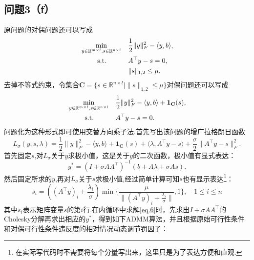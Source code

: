\documentclass[10pt,a4paper]{article}
\begin{document}
\subsection{问题3（f）}
原问题的对偶问题还可以写成
\begin{equation*}
	\begin{aligned}
		&\min_{y\in\mathbb{R}^{m\times l},s\in\mathbb{R}^{n\times l}}  &&\frac{1}{2}\|y\|_F^2 - \langle y, b\rangle,\\
		&\text{\quad\quad\, s.t.} &&A^{\top}y-s=0,\\
		&&&\|s\|_{1,2}\leq\mu.
	\end{aligned}
\end{equation*}
去掉不等式约束，令集合$\textbf{C}=\{s\in\mathbb{R}^{n\times l}|\|s\|_{1,2}\leq\mu\}$对偶问题还可以写成
\begin{equation*}
	\begin{aligned}
		&\min_{y\in\mathbb{R}^{m\times l},s\in\mathbb{R}^{n\times l}}  &&\frac{1}{2}\|y\|_F^2 - \langle y, b\rangle+\mathbf{1}_{\textbf{C}}(s),\\
		&\text{\quad\quad\, s.t.} &&A^{\top}y-s=0.\\
	\end{aligned}
\end{equation*}
问题化为这种形式即可使用交替方向乘子法.首先写出该问题的增广拉格朗日函数
$$L_{\sigma}(y,s,\lambda)=\frac{1}{2}\|y\|_F^2 - \langle y, b\rangle+\mathbf{1}_{\textbf{C}}(s)+\langle\lambda, A^{\top}y-s\rangle +\frac{\sigma}{2}\|A^{\top}y-s\|_{F}^{2}.$$
首先固定$s$,对$L_{\sigma}$关于$y$求极小值，这是关于$y$的二次函数，极小值有显式表达：
\begin{equation}
y^{*}=(I+\sigma AA^{\top})^{-1}(b+A\lambda+\sigma As).
\label{eq.6}
\end{equation}
然后固定所求的$y$,再对$L_{\sigma}$关于$s$求极小值,经过简单计算可知$s$也有显示表达\footnote{在实际写代码时不需要将每个分量写出来，这里只是为了表达方便和直观.}：
\begin{equation}
	s_{i}=\left( (A^{\top}y)_{i}+\frac{\lambda_{i}}{\sigma}\right) \min\{\frac	{\mu}{\|(A^{\top}y)_{i}+\frac{\lambda_{i}}{\sigma}\|},1\},\quad 1\leq i\leq n
\label{eq.7}
\end{equation}
其中$s_{i}$表示矩阵变量$s$的第$i$行.在内循环中求解\eqref{eq.6}时，先求出$I+\sigma AA^{\top}$的Cholesky分解再求出相应的$y^*$，得到如下ADMM算法，并且根据原始可行性条件和对偶可行性条件违反度的相对情况动态调节罚因子：\\
\end{document}
